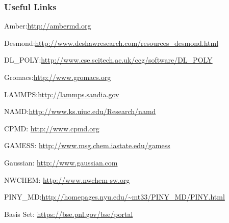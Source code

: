 \documentclass[slidestop,mathserif,compress,xcolor=svgnames]{beamer}
\newenvironment{bblock}[0]
{
\begin{beamerboxesrounded}[upper=uppercol1,lower=lowercol1,shadow=true]}
{\end{beamerboxesrounded}}
\begin{document}
\begin{frame}
  \frametitle{\small Useful Links}
  \begin{bblock}{}
    \begin{itemize}
      {\color{Blue}
      \item{\color{tigerspurple}Amber:}\url{http://ambermd.org}
      \item{\color{tigerspurple}Desmond:}\url{http://www.deshawresearch.com/resources_desmond.html}
      \item{\color{tigerspurple}DL\_POLY:}\url{http://www.cse.scitech.ac.uk/ccg/software/DL_POLY}
      \item{\color{tigerspurple}Gromacs:}\url{http://www.gromacs.org}
      \item{\color{tigerspurple}LAMMPS:}\url{http://lammps.sandia.gov}
      \item{\color{tigerspurple}NAMD:}\url{http://www.ks.uiuc.edu/Research/namd}
      \item {\color{tigerspurple}CPMD:} \url{http://www.cpmd.org}
      \item {\color{tigerspurple}GAMESS:} \url{http://www.msg.chem.iastate.edu/gamess}
      \item {\color{tigerspurple}Gaussian:} \url{http://www.gaussian.com}
      \item {\color{tigerspurple}NWCHEM:} \url{http://www.nwchem-sw.org}
      \item{\color{tigerspurple}PINY\_MD:}\url{http://homepages.nyu.edu/~mt33/PINY_MD/PINY.html}
      \item {\color{tigerspurple}Basis Set:} \url{https://bse.pnl.gov/bse/portal}
      }
    \end{itemize}
  \end{bblock}
\end{frame}
\end{document}
